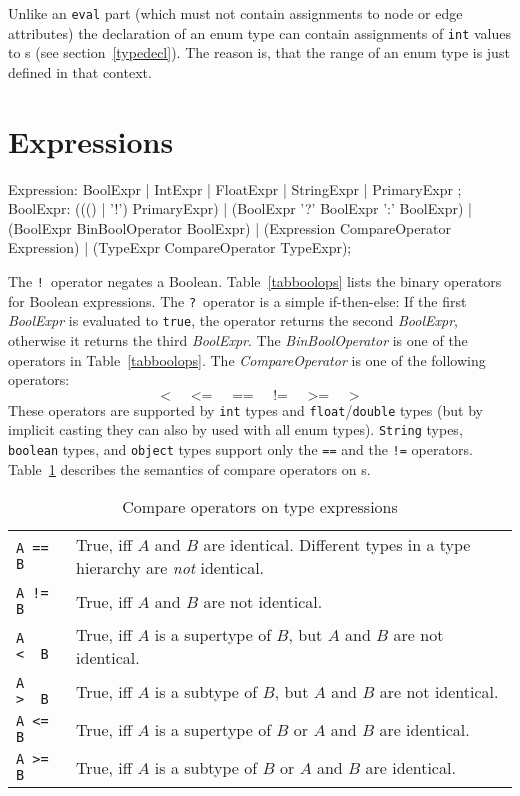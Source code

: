 \begin{note}
	Unlike an {\tt eval} part (which must not contain assignments to node or edge attributes) the declaration of an enum type can contain assignments of {\tt int} values to s (see section~\ref{typedecl}).
	The reason is, that the range of an enum type is just defined in that context.
\end{note}

\section{Expressions}
\label{expressions}
\begin{rail}
  Expression: BoolExpr | IntExpr | FloatExpr | StringExpr | PrimaryExpr ;  
  BoolExpr: ((() | '!') PrimaryExpr) | (BoolExpr '?' BoolExpr ':' BoolExpr) | (BoolExpr BinBoolOperator BoolExpr) | (Expression CompareOperator Expression) | (TypeExpr CompareOperator TypeExpr);
\end{rail}
The \texttt{!}\ operator negates a Boolean. 
Table~\ref{tabboolops} lists the binary operators for Boolean expressions. 
The \texttt{?}\ operator is a simple if-then-else: If the first \emph{BoolExpr} is evaluated to \texttt{true}, the operator returns the second \emph{BoolExpr}, otherwise it returns the third \emph{BoolExpr}.
The \emph{BinBoolOperator} is one of the operators in Table~\ref{tabboolops}.
The \emph{CompareOperator} is one of the following operators:
\[ \texttt{<} \;\;\;\;\; \texttt{<=} \;\;\;\;\; \texttt{==} \;\;\;\;\; \texttt{!=} \;\;\;\;\; \texttt{>=} \;\;\;\;\; \texttt{>} \]
These operators are supported by \texttt{int} types and \texttt{float}/\texttt{double} types (but by implicit casting they can also by used with all enum types).
\texttt{String} types, \texttt{boolean} types, and \texttt{object} types support only the \texttt{==} and the \texttt{!=} operators.
Table~\ref{compandtypes} describes the semantics of compare operators on s.
\begin{table}[htbp]
  \centering
  \begin{tabularx}{\linewidth}{|l|X|} \hline
    \texttt{A == B} & True, iff $A$ and $B$ are identical. Different types in a type hierarchy are \emph{not} identical. \\
    \texttt{A != B} & True, iff $A$ and $B$ are not identical. \\
    \texttt{A <\ \ B} & True, iff $A$ is a supertype of $B$, but $A$ and $B$ are not identical. \\
    \texttt{A >\ \ B} & True, iff $A$ is a subtype of $B$, but $A$ and $B$ are not identical. \\
    \texttt{A <= B} & True, iff $A$ is a supertype of $B$ or $A$ and $B$ are identical. \\
    \texttt{A >= B} & True, iff $A$ is a subtype of $B$ or $A$ and $B$ are identical. \\ \hline
  \end{tabularx}
  \caption{Compare operators on type expressions}
  \label{compandtypes}
\end{table}
